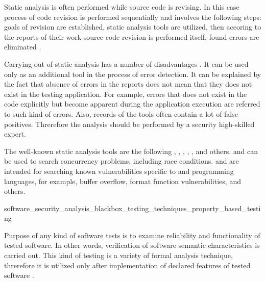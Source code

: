 %
Static analysis is often performed while source code is revising. 
%
In this case process of code revision is performed sequentially and involves the following steps: goals of revision are established, static analysis tools are utilized, then accoring to the reports of their work source code revision is performed itself, found errors are eliminated . 

%
Carrying out of static analysis has a number of disadvantages  . 
%
It can be used only as an additional tool in the process of error detection. 
%
It can be explained by the fact that absence of errors in the reports does not mean that they does not exist in the testing application. 
%
For example, errors that does not exist in the code explicitly but become apparent during the application execution are referred to such kind of errors. 
%
Also, records of the tools often contain a lot of false positives. 
%
Threrefore the analysis should be performed by a security high-skilled expert. 

%
The well-known static analysis tools are the following  ,  ,  ,  ,  , and others.
%
 and  can be used to search concurrency problems, including race conditions. 
%
 and  are intended for searching known vulnerabilities specific to  and  programming languages, for example, buffer overflow, format function vulnerabilities, and others. 


	{software_security_analysis_blackbox_testing_techniques_property_based_testing}

%
Purpose of any kind of software tests is to examine reliability and functionality of tested software. 
%
In other words, verification of software semantic characteristics is carried out. 
%
This kind of testing is a variety of formal analysis technique, threrefore it is utilized only after implementation of declared features of tested software . 

